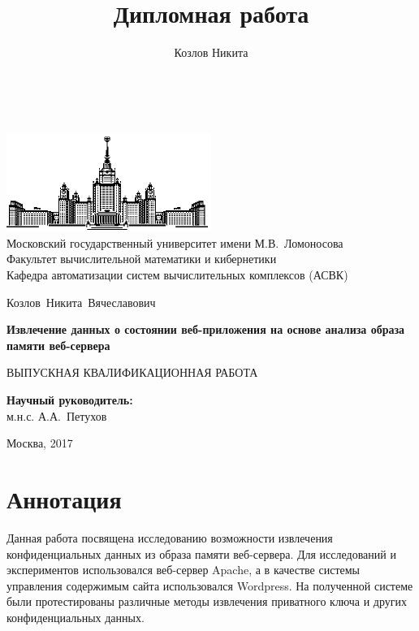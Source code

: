 \documentclass[20pt]{article}
\title{Дипломная работа}
\author{Козлов Никита}
\begin{document}
\thispagestyle{empty}

\begin{center}
\ \vspace{-4cm}

\includegraphics[width=0.5\textwidth]{msu}\\
{Московский государственный университет имени М.В.~Ломоносова}\\
Факультет вычислительной математики и кибернетики\\
Кафедра автоматизации систем вычислительных комплексов (АСВК)

\vspace{5cm}

{\Large Козлов~Никита~Вячеславович}

\vspace{1cm}

{\Large\bfseries
Извлечение данных о состоянии веб-приложения на основе анализа образа памяти веб-сервера\\}

\vspace{1cm}

{\large ВЫПУСКНАЯ КВАЛИФИКАЦИОННАЯ РАБОТА}
\end{center}

\vfill

\begin{flushright}
  \textbf{Научный руководитель:}\\
  м.н.с. А.А.~Петухов
\end{flushright}

\vfill

\begin{center}
Москва, 2017
\end{center}

\enlargethispage{4\baselineskip}

\newpage

\section*{Аннотация}
Данная работа посвящена исследованию возможности извлечения конфиденциальных
данных из образа памяти веб-сервера. Для исследований и экспериментов
использовался веб-сервер Apache, а в качестве системы управления содержимым
сайта использовался Wordpress. На полученной системе были протестированы
различные методы извлечения приватного ключа и других конфиденциальных данных.
\end{document}
